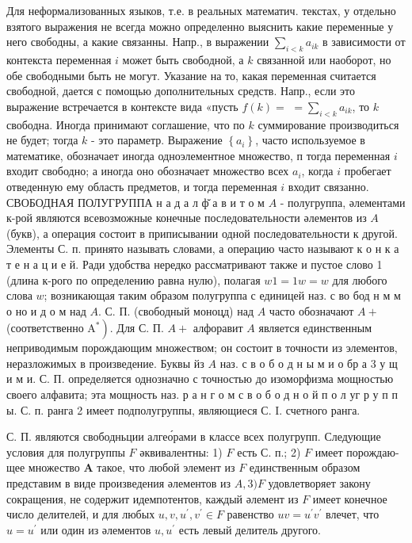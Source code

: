 \documentclass[10pt]{article}
\begin{document}
Для неформализованных языков, т.е. в реальных математич. текстах, у отдельно взятого выражения не всегда можно определенно выяснить какие переменные у него свободны, а какие связанны. Напр., в выражении $\sum_{i<k} a_{i k}$ в зависимости от контекста переменная $i$ может быть свободной, а $k$ связанной или наоборот, но обе свободными быть не могут. Указание на то, какая переменная считается свободной, дается с помощью дополнительных средств. Напр., если это выражение встречается в контексте вида «пусть $f(k)=$ $=\sum_{i<k} a_{i k}$, то $k$ свободна. Иногда принимают соглашение, что по $k$ суммирование производиться не будет; тогда $k$ - это параметр. Выражение $\left\{a_{i}\right\}$, часто используемое в математике, обозначает иногда одноэлементное множество, п тогда переменная $i$ входит свободно; а иногда оно обозначает множество всех $a_{i}$, когда $i$ пробегает отведенную ему область предметов, и тогда переменная $i$ входит связанно. СВОБОДНАЯ ПОЛУГРУППА н а д а л ф̆ а в и т о м $A$ - полугруппа, әлементами к-рой являются всевозможные конечные последовательности әлементов из $A$ (букв), а операция состоит в приписывании одной последовательности к другой. Элементы С. п. принято называть словами, а операцию часто называют к о н к а т е н а ц и е й. Ради удобства нередко рассматривают также и пустое слово 1 (длина к-рого по определению равна нулю), полагая $w 1=1 w=w$ для любого слова $w$; возникающая таким образом полугруппа с единицей наз. с во бод н м м о но и д о м над $A$. С. П. (свободный моноцд) над $A$ часто обозначают $A+$ (соответственно $\left.\mathrm{A}^{*}\right)$. Для С. П. $A+$ алфоравит $A$ является единственным неприводимым порождающим множеством; он состоит в точности из элементов, неразложимых в произведение. Буквы йз $A$ наз. с в о б о д н ы м и о бр а 3 у щ и м и. С. П. определяется однозначно с точностью до изоморфизма мощностью своего алфавита; эта мощность наз. р а н г о м с в о б о д н о й п о л уг р у п п ы. С. п. ранга 2 имеет подполугруппы, являющиеся С. I. счетного ранга.



С. П. являются свободньции алгео́рами в классе всех полугрупп. Следующие условия для полугруппы $F$ әквивалентны: 1) $F$ есть С. п.; 2) $F$ имеет порождаю- щее множество $\boldsymbol{A}$ такое, что любой элемент из $F$ единственным образом представим в виде произведения әлементов из $A, 3) F$ удовлетворяет закону сокращения, не содержит идемпотентов, каждый әлемент из $F$ имеет конечное число делителей, и для любых $u, v, u^{\prime}, v^{\prime} \in F$ равенство $u v=u^{\prime} v^{\prime}$ влечет, что $u=u^{\prime}$ или один из әлементов $u, u^{\prime}$ есть левый делитель другого.
\end{document}
